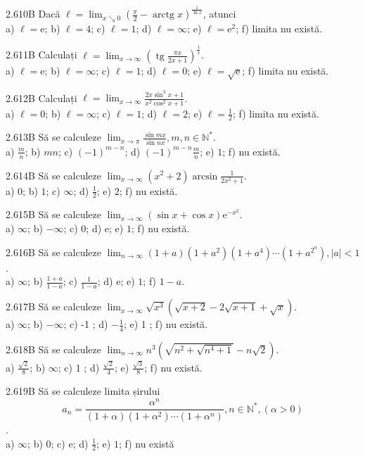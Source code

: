 \documentclass[11pt]{article}
\begin{document}
2.610B Dacă $\ell=\lim _{x \searrow 0}\left(\frac{\pi}{2}-\operatorname{arctg} x\right)^{\frac{1}{\ln x}}$, atunci\\ a) $\ell=\mathrm{e}$; b) $\ell=4$; c) $\ell=1$; d) $\ell=\infty$; e) $\ell=\mathrm{e}^{2}$; f) limita nu există.

2.611B Calculați $\ell=\lim _{x \rightarrow \infty}\left(\operatorname{tg} \frac{\pi x}{2 x+1}\right)^{\frac{1}{x}}$.\\ a) $\ell=\mathrm{e}$; b) $\ell=\infty$; c) $\ell=1$; d) $\ell=0$; e) $\ell=\sqrt{\mathrm{e}}$; f) limita nu există.

2.612B Calculați $\ell=\lim _{x \rightarrow \infty} \frac{2 x \sin ^{3} x+1}{x^{2} \cos ^{2} x+1}$.\\ a) $\ell=0$; b) $\ell=\infty$; c) $\ell=1$; d) $\ell=2$; e) $\ell=\frac{1}{2}$; f) limita nu există.

2.613B Să se calculeze $\lim _{x \rightarrow \pi} \frac{\sin m x}{\sin n x}, m, n \in \mathbb{N}^{*}$.\\ a) $\frac{m}{n}$; b) $m n$; c) $(-1)^{m-n}$; d) $(-1)^{m-n} \frac{m}{n}$; e) $1$; f) nu există.

2.614B Să se calculeze $\lim _{x \rightarrow \infty}\left(x^{2}+2\right) \arcsin \frac{1}{2 x^{2}+1}$.\\ a) $0$; b) $1$; c) $\infty$; d) $\frac{1}{2}$; e) $2$; f) nu există.

2.615B Să se calculeze $\lim _{x \rightarrow \infty}(\sin x+\cos x) \mathrm{e}^{-x^{2}}$.\\ a) $\infty$; b) $-\infty$; c) $0$; d) $\mathrm{e}$; e) $1$; f) nu există.

2.616B Să se calculeze $\lim _{n \rightarrow \infty}(1+a)\left(1+a^{2}\right)\left(1+a^{4}\right) \cdots\left(1+a^{2^{n}}\right),|a|<1$.\\ a) $\infty$; b) $\frac{1+a}{1-a}$; c) $\frac{1}{1-a}$; d) $\mathrm{e}$; e) $1$; f) $1-a$.

2.617B Să se calculeze $\lim _{x \rightarrow \infty} \sqrt{x^{3}}(\sqrt{x+2}-2 \sqrt{x+1}+\sqrt{x})$.\\ a) $\infty$; b) $-\infty$; c) -1 ; d) $-\frac{1}{4}$; e) 1 ; f) nu există.

2.618B Să se calculeze $\lim _{n \rightarrow \infty} n^{3}\left(\sqrt{n^{2}+\sqrt{n^{4}+1}}-n \sqrt{2}\right)$.\\ a) $\frac{\sqrt{2}}{8}$; b) $\infty$; c) 1 ; d) $\frac{\sqrt{2}}{4}$; e) $\frac{\sqrt{3}}{8}$; f) nu există.

2.619B Să se calculeze limita șirului $$a_{n} = \frac{\alpha^{n}}{(1+\alpha)(1+\alpha^{2})\cdots(1+\alpha^{n})}, n \in \mathbb{N}^{*}, (\alpha > 0)$$.\\ a) $\infty$; b) $0$; c) $\mathrm{e}$; d) $\frac{1}{2}$; e) $1$; f) nu există
\end{document}

